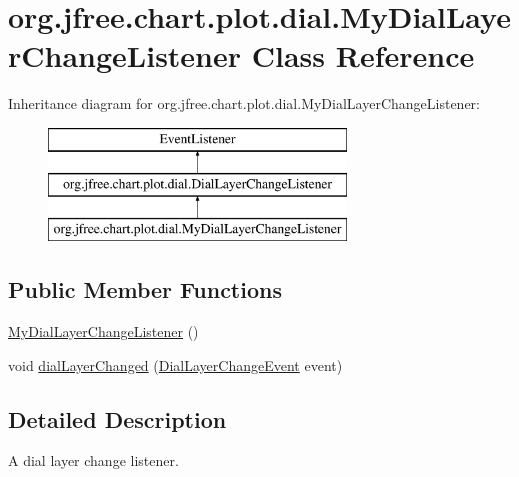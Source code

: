 \hypertarget{classorg_1_1jfree_1_1chart_1_1plot_1_1dial_1_1_my_dial_layer_change_listener}{}\section{org.\+jfree.\+chart.\+plot.\+dial.\+My\+Dial\+Layer\+Change\+Listener Class Reference}
\label{classorg_1_1jfree_1_1chart_1_1plot_1_1dial_1_1_my_dial_layer_change_listener}
Inheritance diagram for org.\+jfree.\+chart.\+plot.\+dial.\+My\+Dial\+Layer\+Change\+Listener\+:\begin{figure}[H]
\begin{center}
\leavevmode
\includegraphics[height=3.000000cm]{classorg_1_1jfree_1_1chart_1_1plot_1_1dial_1_1_my_dial_layer_change_listener}
\end{center}
\end{figure}
\subsection*{Public Member Functions}
\begin{DoxyCompactItemize}
\item 
\mbox{\hyperlink{classorg_1_1jfree_1_1chart_1_1plot_1_1dial_1_1_my_dial_layer_change_listener_ad6081adeee120c46906887b446b8ea7c}{My\+Dial\+Layer\+Change\+Listener}} ()
\item 
void \mbox{\hyperlink{classorg_1_1jfree_1_1chart_1_1plot_1_1dial_1_1_my_dial_layer_change_listener_aea7aacb233552b8f721c5de636a98cab}{dial\+Layer\+Changed}} (\mbox{\hyperlink{classorg_1_1jfree_1_1chart_1_1plot_1_1dial_1_1_dial_layer_change_event}{Dial\+Layer\+Change\+Event}} event)
\end{DoxyCompactItemize}


\subsection{Detailed Description}
A dial layer change listener. 

